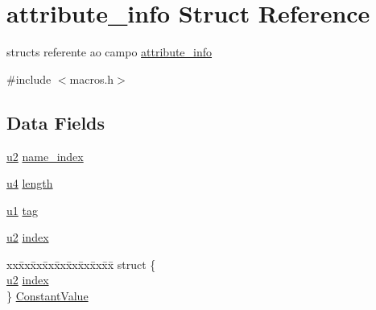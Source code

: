 \hypertarget{structattribute__info}{}\section{attribute\+\_\+info Struct Reference}
\label{structattribute__info}


structs referente ao campo \hyperlink{structattribute__info}{attribute\+\_\+info}  




{\ttfamily \#include $<$macros.\+h$>$}

\subsection*{Data Fields}
\begin{DoxyCompactItemize}
\item 
\hyperlink{macros_8h_aa76d8c8015643c6a837661a10142016e}{u2} \hyperlink{structattribute__info_ae939ac3ca00f5727beaa02d0e339183d}{name\+\_\+index}
\item 
\hyperlink{macros_8h_a4af10c3137cf79c12265e8d288070711}{u4} \hyperlink{structattribute__info_aacc1df3514df75a66b1332c31b41e4f3}{length}
\item 
\hyperlink{macros_8h_a8026a39c502750413402a90d9d8bae3c}{u1} \hyperlink{structattribute__info_a17726ed17c64ec8550633ebf17fd1a98}{tag}
\item 
\hyperlink{macros_8h_aa76d8c8015643c6a837661a10142016e}{u2} \hyperlink{structattribute__info_a125cab34bc0dc872fa4a0aedbe688365}{index}
\item 
\begin{tabbing}
xx\=xx\=xx\=xx\=xx\=xx\=xx\=xx\=xx\=\kill
struct \{\\
\>\hyperlink{macros_8h_aa76d8c8015643c6a837661a10142016e}{u2} \hyperlink{structattribute__info_a125cab34bc0dc872fa4a0aedbe688365}{index}\\
\} \hyperlink{structattribute__info_ad1574e24f8d417c12341b834d96ac755}{ConstantValue}\\


\end{tabbing}
\end{DoxyCompactItemize}
